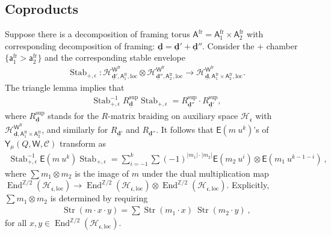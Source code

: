 \documentclass[10pt]{amsart}
\theoremstyle{definition}
\numberwithin{equation}{section}
\newcommand{\bZ}{\mathbb{Z}}
\newcommand{\bd}{\mathbf{d}}
\newcommand{\cH}{\mathcal{H}}
\newcommand{\loc}{\mathrm{loc}}
\newcommand{\sA}{\mathsf{A}}
\newcommand{\sW}{\mathsf{W}}
\newcommand{\End}{\operatorname{End}}
\newcommand{\Stab}{\operatorname{Stab}}
\newcommand{\str}{\operatorname{Str}}
\begin{document}
\subsection{Coproducts}\label{sect on coprod}
Suppose there is a decomposition of framing torus $\sA^{\mathrm{fr}}=\sA^{\mathrm{fr}}_1\times \sA^{\mathrm{fr}}_2$ with corresponding decomposition of framing: $\underline{\bd}=\underline{\bd}'+\underline{\bd}''$. Consider the $+$ chamber $\{\mathsf a^{\mathrm{fr}}_1> \mathsf a^{\mathrm{fr}}_2\}$ and the corresponding stable envelope
\begin{align*}
    \Stab_{+,\epsilon}\colon \cH^{\sW^{\mathrm{fr}}}_{\underline{\bd}',\sA^{\mathrm{fr}}_1,\loc}\otimes \cH^{\sW^{\mathrm{fr}}}_{\underline{\bd}'',\sA^{\mathrm{fr}}_2,\loc}\to \cH^{\sW^{\mathrm{fr}}}_{\underline{\bd},\sA^{\mathrm{fr}}_1\times \sA^{\mathrm{fr}}_2,\loc}.
\end{align*}
The triangle lemma implies that
\begin{align*}
\Stab_{+,\epsilon}^{-1}R^{\mathrm{sup}}_{\underline{\bd}}\Stab_{+,\epsilon}=R^{\mathrm{sup}}_{\underline{\bd}''}\cdot R^{\mathrm{sup}}_{\underline{\bd}'},
\end{align*}
where $R^{\mathrm{sup}}_{\underline{\bd}}$ stands for the $R$-matrix braiding on auxiliary space $\cH_{\mathfrak{c}}$ with $\cH^{\sW^{\mathrm{fr}}}_{\underline{\bd},\sA^{\mathrm{fr}}_1\times \sA^{\mathrm{fr}}_2}$, and similarly for $R_{\underline{\bd}'}$ and $R_{\underline{\bd}''}$.
It follows that $\mathsf E(m\: u^k)$'s of $\mathsf Y_\mu(Q,\sW,\mathcal C)$ transform as 
\begin{align}\label{stab induces coproduct}
    \Stab_{+,\epsilon}^{-1}\mathsf E(m\: u^k)\Stab_{+,\epsilon}=\sum_{i=-1}^k\sum (-1)^{|m_1|\cdot |m_2|}\mathsf E(m_2\:u^i)\otimes \mathsf E(m_1\:u^{k-1-i})\:,
\end{align}
where $\sum m_1\otimes m_2$ is the image of $m$ under the dual multiplication map $\End^{\bZ/2}(\cH_{\mathfrak{c},\loc})\to \End^{\bZ/2}(\cH_{\mathfrak{c},\loc})\otimes \End^{\bZ/2}(\cH_{\mathfrak{c},\loc})$. Explicitly, $\sum m_1\otimes m_2$ is determined by requiring
\begin{align*}
    \str(m\cdot x \cdot y)=\sum\str(m_1\cdot x)\: \str(m_2\cdot y)\:,
\end{align*}
for all $x,y\in \End^{\bZ/2}(\cH_{\mathfrak{c},\loc})$.
\end{document}
